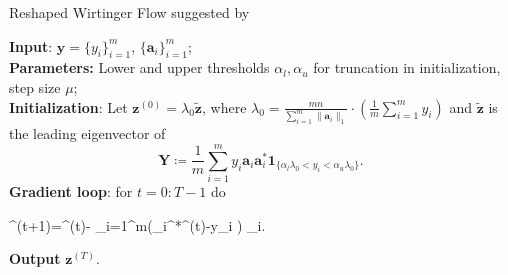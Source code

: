 	\begin{algorithm}
	\caption{Reshaped Wirtinger Flow suggested by \cite{zhang2016reshaped}}\label{alg:rwf}
		\textbf{Input}: $\boldsymbol{y}=\{y_i\}_{i=1}^m$, $\{\boldsymbol{a}_i\}_{i=1}^m$; \\
		\textbf{Parameters:}  Lower and upper thresholds $\alpha_l,\alpha_u$ for  truncation in initialization, step size $\mu$;\\
		\textbf{Initialization}: Let $\boldsymbol{z}^{(0)}=\lambda_0 \tilde{\boldsymbol{z}}$, where $\lambda_0=\frac{mn}{\sum_{i=1}^m \|\boldsymbol{a}_i\|_1}\cdot \left(\frac{1}{m}\sum_{i=1}^m y_i\right)$ and $\tilde{\boldsymbol{z}}$ is the leading eigenvector of
		\begin{equation}\label{eq:init_TRWF}
			\boldsymbol{Y} \coloneqq \frac{1}{m}\sum_{i=1}^m y_i\boldsymbol{a}_i \boldsymbol{a}_i^*\boldsymbol{1}_{\{\alpha_l \lambda_0<y_i< \alpha_u \lambda_0\}}.
		\end{equation}
		\textbf{Gradient loop}: for $t=0:T-1$ do
		\begin{flalign}\label{eq:loop_FWF}
			^{(t+1)}=^{(t)}- \sum_{i=1}^{m}\left(_i^*^{(t)}-y_i\cdot{} \right) _i.
		\end{flalign}
		\textbf{Output} $\boldsymbol{z}^{(T)}$.
	\end{algorithm}

